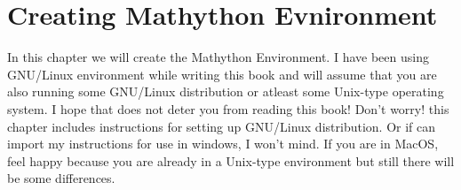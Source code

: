 
\chapter{Creating Mathython Evnironment}

In this chapter we will create the {\color{cyan} Mathython}  Environment. I have been using GNU/Linux environment while writing this book
and will assume that you are also running some GNU/Linux distribution or atleast some Unix-type operating system. I hope that
does not deter you from reading this book! {\color{cyan} Don't worry! this chapter includes instructions for setting up GNU/Linux distribution.}
Or if can import my instructions for use in windows, I won't mind. If you are in MacOS, feel happy because you are already
in a Unix-type environment but still there will be some differences.  